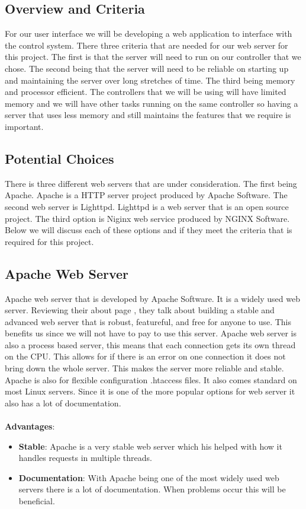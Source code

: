 \documentclass[onecolumn, draftclsnofoot,10pt, compsoc]{IEEEtran}
\begin{document}
		\subsection{Overview and Criteria}
	  For our user interface we will be developing a web application to interface
		with the control system. There three criteria that are needed for our web
		server for this project. The first is that the server will need to run on
		our controller that we chose. The second being that the server will need to
		be reliable on starting up and maintaining the server over long stretches of
		time. The third being memory and processor efficient. The controllers that
		we will be using will have limited memory and we will have other tasks
		running on the same controller so having a server that uses less memory and
		still maintains the features that we require is important.
		\subsection{Potential Choices }
		There is three different web servers that are under consideration. The first
		being Apache. Apache is a HTTP server project produced by Apache Software. The
		second web server is Lighttpd. Lighttpd is a web server that is an open source
		project. The third option is Niginx web service produced by NGINX Software.
		Below we will discuss each of these options and if they meet the criteria
		that is required for this project.
		\subsection{Apache Web Server}
		Apache web server that is developed by Apache Software. It is a widely used
		web server. Reviewing their about page \cite{Apache}, they talk about
		building a stable and advanced web server that is robust, featureful, and
		free for anyone to use. This benefits us since we will not have to pay to use
		this server. Apache web server is also a process based server, this means
		that each connection gets its own thread on the CPU. This allows for if there
		is an error on one connection it does not bring down the whole server. This
		makes the server more reliable and stable. Apache is also for flexible configuration
		.htaccess files. It also comes standard on most Linux servers. Since it is
		one of the more popular options for web server it also has a lot of documentation.
		\\\\
		\textbf{Advantages}:
		\begin{itemize}
			\item \textbf{Stable}: Apache is a very stable web server which his helped
			with how it handles requests in multiple threads.

			\item \textbf{Documentation}: With Apache being one of the most widely used
			web servers there is a lot of documentation. When problems occur this will
			be beneficial.
		\end{itemize}
\end{document}
